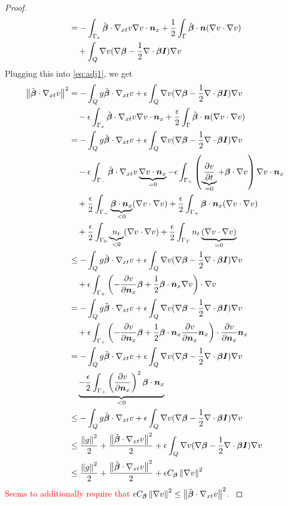 \documentclass{article}
\begin{document}
\begin{proof}
\begin{align*}
&=-\int_{\Gamma_x}\tilde{\boldsymbol\beta}\cdot\nabla_{xt} v\nabla v\cdot\boldsymbol n_x
+\frac{1}{2}\int_\Gamma\tilde{\boldsymbol\beta}\cdot\boldsymbol n(\nabla v\cdot\nabla v)\\
&\quad+\int_Q\nabla v(\nabla\boldsymbol\beta-\frac{1}{2}\nabla\cdot\boldsymbol\beta\boldsymbol I)\nabla v\\
\end{align*}
Plugging this into \eqref{eq:adj1}, we get
\begin{align*}
\norm{\tilde\bfbeta\cdot\Gradxt v}^2
&=-\int_Q g\tilde\bfbeta\cdot\Gradxt v
+\epsilon\int_Q\Grad v(\Grad\bfbeta-\frac{1}{2}\Div\bfbeta\bfI)\Grad v\\
&\quad-\epsilon\int_{\Gamma_x}\tilde\bfbeta\cdot\Gradxt v\Grad v\cdot\bfn_x
+\frac{\epsilon}{2}\int_\Gamma\tilde\bfbeta\cdot\bfn(\Grad v\cdot\Grad v)\\
%
&=-\int_Q g\tilde\bfbeta\cdot\Gradxt v
+\epsilon\int_Q\Grad v(\Grad\bfbeta-\frac{1}{2}\Div\bfbeta\bfI)\Grad v\\
&\quad
-\epsilon\int_{\Gamma_-}\tilde\bfbeta\cdot\Gradxt v\underbrace{\Grad v\cdot\bfn_x}_{=0}
-\epsilon\int_{\Gamma_+}\LRp{\underbrace{\pd{v}{t}}_{=0}+\bfbeta\cdot\Grad v}\Grad v\cdot\bfn_x\\
&\quad
+\frac{\epsilon}{2}\int_{\Gamma_-}\underbrace{\bfbeta\cdot\bfn_x}_{<0}(\Grad v\cdot\Grad v)
+\frac{\epsilon}{2}\int_{\Gamma_+}\bfbeta\cdot\bfn_x(\Grad v\cdot\Grad v)\\
&\quad
+\frac{\epsilon}{2}\int_{\Gamma_0}\underbrace{n_t}_{<0}(\Grad v\cdot\Grad v)
+\frac{\epsilon}{2}\int_{\Gamma_T}n_t\underbrace{(\Grad v\cdot\Grad v)}_{=0}\\
%
&\leq-\int_Q g\tilde\bfbeta\cdot\Gradxt v
+\epsilon\int_Q\Grad v(\Grad\bfbeta-\frac{1}{2}\Div\bfbeta\bfI)\Grad v\\
&\quad
+\epsilon\int_{\Gamma_+}\LRp{-\pd{v}{\bfn_x}\bfbeta
+\frac{1}{2}\bfbeta\cdot\bfn_x\Grad v}\cdot\Grad v\\
%
&=-\int_Q g\tilde\bfbeta\cdot\Gradxt v
+\epsilon\int_Q\Grad v(\Grad\bfbeta-\frac{1}{2}\Div\bfbeta\bfI)\Grad v\\
&\quad
+\epsilon\int_{\Gamma_+}\LRp{-\pd{v}{\bfn_x}\bfbeta
+\frac{1}{2}\bfbeta\cdot\bfn_x\pd{v}{\bfn_x}\bfn_x}\cdot\pd{v}{\bfn_x}\bfn_x\\
%
&=-\int_Q g\tilde\bfbeta\cdot\Gradxt v
+\epsilon\int_Q\Grad v(\Grad\bfbeta-\frac{1}{2}\Div\bfbeta\bfI)\Grad v\\
&\quad
\underbrace{-\frac{\epsilon}{2}\int_{\Gamma_+}\LRp{\pd{v}{\bfn_x}}^2\bfbeta\cdot\bfn_x}_{<0}\\
%
&\leq-\int_Q g\tilde\bfbeta\cdot\Gradxt v
+\epsilon\int_Q\Grad v(\Grad\bfbeta-\frac{1}{2}\Div\bfbeta\bfI)\Grad v\\
%
&\leq\frac{\norm{g}^2}{2}+\frac{\norm{\tilde\bfbeta\cdot\Gradxt v}^2}{2}
+\epsilon\int_Q\Grad v(\Grad\bfbeta-\frac{1}{2}\Div\bfbeta\bfI)\Grad v\\
%
&\leq\frac{\norm{g}^2}{2}+\frac{\norm{\tilde\bfbeta\cdot\Gradxt v}^2}{2}
+\epsilon C_{\bfbeta}\norm{\Grad v}^2
\end{align*}
\textcolor{red}{
Seems to additionally require that $\epsilon C_{\boldsymbol\beta}\left\| \nabla v \right\|^2\le\left\| \tilde{\boldsymbol\beta}\cdot\nabla_{xt} v \right\|^2$.
}
\end{proof}
\end{document}
